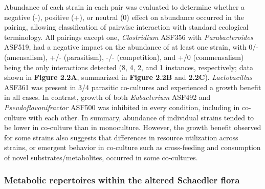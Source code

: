\documentclass[11pt,onecolumn,notitlepage,openany,twoside]{book}
\begin{document}
\begin{refsection}
Abundance of each strain in each pair was evaluated to determine whether a negative (-), positive (+), or neutral (0) effect on abundance occurred in the pairing, allowing classification of pairwise interaction with standard ecological terminology. All pairings except one, \textit{Clostridium} ASF356 with \textit{Parabacteroides} ASF519, had a negative impact on the abundance of at least one strain, with 0/- (amensalism), +/- (parasitism), -/- (competition), and +/0 (commensalism) being the only interactions detected (8, 4, 2, and 1 instances, respectively; data shown in \textbf{Figure 2.2A}, summarized in \textbf{Figure 2.2B} and \textbf{2.2C}). \textit{Lactobacillus} ASF361 was present in 3/4 parasitic co-cultures and experienced a growth benefit in all cases. In contrast, growth of both \textit{Eubacterium} ASF492 and \textit{Pseudoflavonifractor} ASF500 was inhibited in every condition, including in co-culture with each other. In summary, abundance of individual strains tended to be lower in co-culture than in monoculture. However, the growth benefit observed for some strains also suggests that differences in resource utilization across strains, or emergent behavior in co-culture such as cross-feeding and consumption of novel substrates/metabolites, occurred in some co-cultures.

\subsubsection{Metabolic repertoires within the altered Schaedler flora}


\end{refsection}
\end{document}
